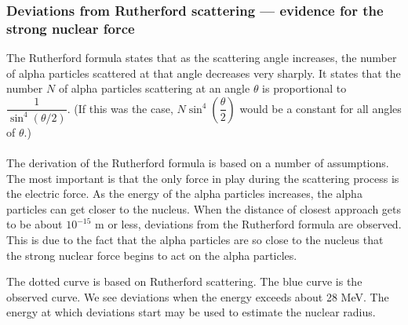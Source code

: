 \documentclass[a4paper,12pt]{article}
\begin{document}
\subsubsection*{Deviations from Rutherford scattering — evidence for the strong nuclear force}
The Rutherford formula states that as the scattering angle increases, the number of alpha particles scattered at that angle decreases very sharply.
It states that the number $N$ of alpha particles scattering at an angle $\theta$ is proportional to $\dfrac{1}{\sin^4(\theta/2)}$. (If this was the case, $N\sin^4\left(\dfrac{\theta}{2}\right)$ would be a constant for all angles of $\theta$.)\\\\
The derivation of the Rutherford formula is based on a number of assumptions. The most important is that the only force in play during the scattering process is the electric force. As the energy of the alpha particles increases, the alpha particles can get closer to the nucleus. When the distance of closest approach gets to be
about $10^{-15}$ m or less, deviations from the Rutherford formula are observed. This is due to the fact that the alpha particles are so close to the nucleus that the strong nuclear force begins to act on the alpha particles. 
\begin{center}
\end{center}
The dotted curve is based on Rutherford scattering. The blue curve is the observed curve. We see deviations when the energy exceeds about 28 MeV. The energy at which deviations start may be used to estimate the nuclear radius.
\end{document}
